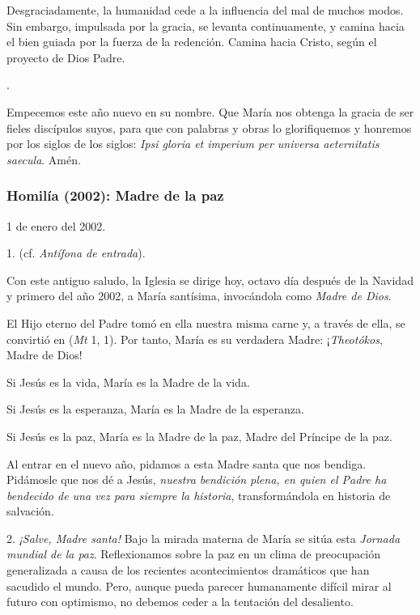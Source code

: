 \begin{body}
\begin{body}
Desgraciadamente, la humanidad cede a la influencia del mal de muchos modos. Sin embargo, impulsada por la gracia, se levanta continuamente, y camina hacia el bien guiada por la fuerza de la redención. Camina hacia Cristo, según el proyecto de Dios Padre.

.

Empecemos este año nuevo en su nombre. Que María nos obtenga la gracia de ser fieles discípulos suyos, para que con palabras y obras lo glorifiquemos y honremos por los siglos de los siglos: \emph{Ipsi gloria et imperium per universa aeternitatis saecula}. Amén.

\subsubsection{Homilía (2002): Madre de la paz}

1 de enero del 2002.

1.  (cf. \emph{Antífona de entrada}).

Con este antiguo saludo, la Iglesia se dirige hoy, octavo día después de la Navidad y primero del año 2002, a María santísima, invocándola como \emph{Madre de Dios}.

El Hijo eterno del Padre tomó en ella nuestra misma carne y, a través de ella, se convirtió en  (\emph{Mt} 1, 1). Por tanto, María es su verdadera Madre: ¡\emph{Theotókos}, Madre de Dios!

Si Jesús es la vida, María es la Madre de la vida.

Si Jesús es la esperanza, María es la Madre de la esperanza.

Si Jesús es la paz, María es la Madre de la paz, Madre del Príncipe de la paz.

Al entrar en el nuevo año, pidamos a esta Madre santa que nos bendiga. Pidámosle que nos dé a Jesús, \emph{nuestra bendición plena, en quien el Padre ha bendecido de una vez para siempre la historia}, transformándola en historia de salvación.

2. \emph{¡Salve, Madre santa!} Bajo la mirada materna de María se sitúa esta \emph{Jornada mundial de la paz}. Reflexionamos sobre la paz en un clima de preocupación generalizada a causa de los recientes acontecimientos dramáticos que han sacudido el mundo. Pero, aunque pueda parecer humanamente difícil mirar al futuro con optimismo, no debemos ceder a la tentación del desaliento.


\end{body}
\end{body}
